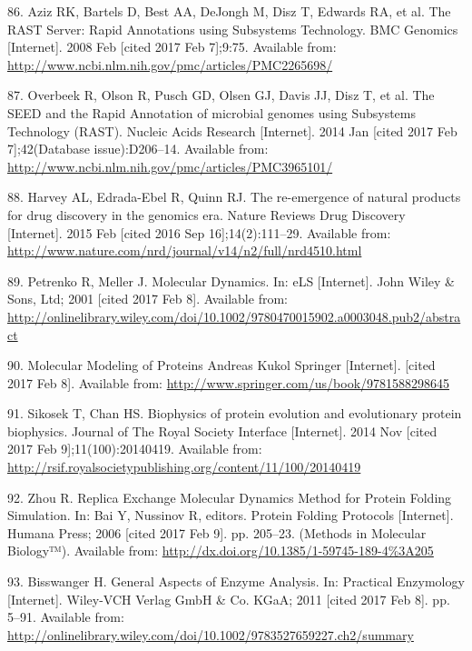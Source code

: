 \documentclass[12pt,twoside]{reedthesis}
\begin{document}
  \hypertarget{ref-aziz_rast_2008}{}
  86. Aziz RK, Bartels D, Best AA, DeJongh M, Disz T, Edwards RA, et al.
  The RAST Server: Rapid Annotations using Subsystems Technology. BMC
  Genomics {[}Internet{]}. 2008 Feb {[}cited 2017 Feb 7{]};9:75. Available
  from: \url{http://www.ncbi.nlm.nih.gov/pmc/articles/PMC2265698/}
  
  \hypertarget{ref-overbeek_seed_2014}{}
  87. Overbeek R, Olson R, Pusch GD, Olsen GJ, Davis JJ, Disz T, et al.
  The SEED and the Rapid Annotation of microbial genomes using Subsystems
  Technology (RAST). Nucleic Acids Research {[}Internet{]}. 2014 Jan
  {[}cited 2017 Feb 7{]};42(Database issue):D206--14. Available from:
  \url{http://www.ncbi.nlm.nih.gov/pmc/articles/PMC3965101/}
  
  \hypertarget{ref-harvey_re-emergence_2015}{}
  88. Harvey AL, Edrada-Ebel R, Quinn RJ. The re-emergence of natural
  products for drug discovery in the genomics era. Nature Reviews Drug
  Discovery {[}Internet{]}. 2015 Feb {[}cited 2016 Sep
  16{]};14(2):111--29. Available from:
  \url{http://www.nature.com/nrd/journal/v14/n2/full/nrd4510.html}
  
  \hypertarget{ref-petrenko_molecular_2001}{}
  89. Petrenko R, Meller J. Molecular Dynamics. In: eLS {[}Internet{]}.
  John Wiley \& Sons, Ltd; 2001 {[}cited 2017 Feb 8{]}. Available from:
  \url{http://onlinelibrary.wiley.com/doi/10.1002/9780470015902.a0003048.pub2/abstract}
  
  \hypertarget{ref-kukol_molecular_2008}{}
  90. Molecular Modeling of Proteins Andreas Kukol Springer
  {[}Internet{]}. {[}cited 2017 Feb 8{]}. Available from:
  \url{http://www.springer.com/us/book/9781588298645}
  
  \hypertarget{ref-sikosek_biophysics_2014}{}
  91. Sikosek T, Chan HS. Biophysics of protein evolution and evolutionary
  protein biophysics. Journal of The Royal Society Interface
  {[}Internet{]}. 2014 Nov {[}cited 2017 Feb 9{]};11(100):20140419.
  Available from:
  \url{http://rsif.royalsocietypublishing.org/content/11/100/20140419}
  
  \hypertarget{ref-bai_replica_2006}{}
  92. Zhou R. Replica Exchange Molecular Dynamics Method for Protein
  Folding Simulation. In: Bai Y, Nussinov R, editors. Protein Folding
  Protocols {[}Internet{]}. Humana Press; 2006 {[}cited 2017 Feb 9{]}. pp.
  205--23. (Methods in Molecular Biology™). Available from:
  \url{http://dx.doi.org/10.1385/1-59745-189-4\%3A205}
  
  \hypertarget{ref-bisswanger_general_2011}{}
  93. Bisswanger H. General Aspects of Enzyme Analysis. In: Practical
  Enzymology {[}Internet{]}. Wiley-VCH Verlag GmbH \& Co. KGaA; 2011
  {[}cited 2017 Feb 8{]}. pp. 5--91. Available from:
  \url{http://onlinelibrary.wiley.com/doi/10.1002/9783527659227.ch2/summary}
  
\end{document}
